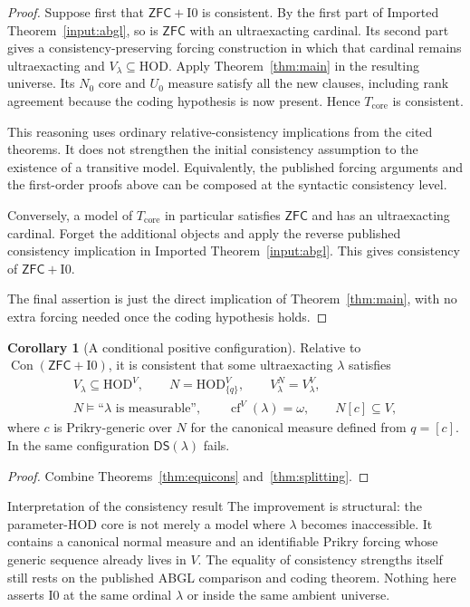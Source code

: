 \documentclass[11pt,letterpaper]{article}
\theoremstyle{definition}
\newtheorem{corollary}[definition]{Corollary}
\newcommand{\ZFC}{\mathsf{ZFC}}
\newcommand{\HOD}{\mathrm{HOD}}
\newcommand{\Con}{\operatorname{Con}}
\newcommand{\cf}{\operatorname{cf}}
\newcommand{\Izero}{\mathrm I0}
\begin{document}
\begin{proof}
Suppose first that $\ZFC+\Izero$ is consistent. By the first part of Imported Theorem~\ref{input:abgl}, so is $\ZFC$ with an ultraexacting cardinal. Its second part gives a consistency-preserving forcing construction in which that cardinal remains ultraexacting and $V_\lambda\subseteq\HOD$. Apply Theorem~\ref{thm:main} in the resulting universe. Its $N_0$ core and $U_0$ measure satisfy all the new clauses, including rank agreement because the coding hypothesis is now present. Hence $T_{\mathrm{core}}$ is consistent.

This reasoning uses ordinary relative-consistency implications from the cited theorems. It does not strengthen the initial consistency assumption to the existence of a transitive model. Equivalently, the published forcing arguments and the first-order proofs above can be composed at the syntactic consistency level.

Conversely, a model of $T_{\mathrm{core}}$ in particular satisfies $\ZFC$ and has an ultraexacting cardinal. Forget the additional objects and apply the reverse published consistency implication in Imported Theorem~\ref{input:abgl}. This gives consistency of $\ZFC+\Izero$.

The final assertion is just the direct implication of Theorem~\ref{thm:main}, with no extra forcing needed once the coding hypothesis holds.
\end{proof}

\begin{corollary}[A conditional positive configuration]\label{cor:positive}
Relative to $\Con(\ZFC+\Izero)$, it is consistent that some ultraexacting $\lambda$ satisfies
\[
 \begin{gathered}
 V_\lambda\subseteq\HOD^V,\qquad
 N=\HOD_{\{q\}}^V,\qquad V_\lambda^N=V_\lambda^V,\\
 N\models\text{``$\lambda$ is measurable''},\qquad
 \cf^V(\lambda)=\omega,\qquad N[c]\subseteq V,
 \end{gathered}
\]
where $c$ is Prikry-generic over $N$ for the canonical measure defined from $q=[c]$. In the same configuration $\mathsf{DS}(\lambda)$ fails.
\end{corollary}

\begin{proof}
Combine Theorems~\ref{thm:equicons} and~\ref{thm:splitting}.
\end{proof}

\begin{assessment}{Interpretation of the consistency result}
The improvement is structural: the parameter-HOD core is not merely a model where $\lambda$ becomes inaccessible. It contains a canonical normal measure and an identifiable Prikry forcing whose generic sequence already lives in $V$. The equality of consistency strengths itself still rests on the published ABGL comparison and coding theorem. Nothing here asserts $\Izero$ at the same ordinal $\lambda$ or inside the same ambient universe.
\end{assessment}
\end{document}
